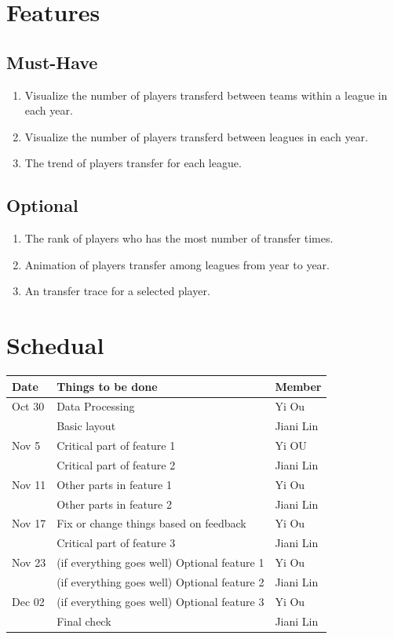 \documentclass[11pt]{article}
\begin{document}
\section{Features}
\label{sec-5}
\subsection{Must-Have}
\label{sec-5-1}
\begin{enumerate}
\item Visualize the number of players transferd between teams within a league in each year.
\item Visualize the number of players transferd between leagues in each year.
\item The trend of players transfer for each league.
\end{enumerate}
\subsection{Optional}
\label{sec-5-2}
\begin{enumerate}
\item The rank of players who has the most number of transfer times.
\item Animation of players transfer among leagues from year to year.
\item An transfer trace for a selected player.
\end{enumerate}
\section{Schedual}
\label{sec-6}

\begin{center}
\begin{tabular}{lll}
Date & Things to be done & Member\\
\hline
Oct 30 & Data Processing & Yi Ou\\
 & Basic layout & Jiani Lin\\
\hline
Nov 5 & Critical part of feature 1 & Yi OU\\
 & Critical part of feature 2 & Jiani Lin\\
\hline
Nov 11 & Other parts in feature 1 & Yi Ou\\
 & Other parts in feature 2 & Jiani Lin\\
\hline
Nov 17 & Fix or change things based on feedback & Yi Ou\\
 & Critical part of feature 3 & Jiani Lin\\
\hline
Nov 23 & (if everything goes well) Optional feature 1 & Yi Ou\\
 & (if everything goes well) Optional feature 2 & Jiani Lin\\
\hline
Dec 02 & (if everything goes well) Optional feature 3 & Yi Ou\\
 & Final check & Jiani Lin\\
\hline
\end{tabular}
\end{center}
\end{document}
